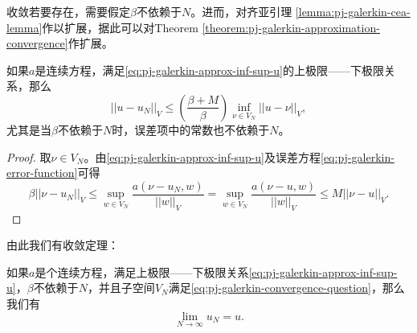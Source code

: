 \begin{subappendices}
收敛若要存在，需要假定$\beta$不依赖于$N$。进而，\cite{Babuska:1971fx}对齐亚引理 \ref{lemma:pj-galerkin-cea-lemma}作以扩展，据此可以对Theorem \ref{theorem:pj-galerkin-approximation-convergence}作扩展。
\begin{lemma}[扩展齐亚引理]
  \label{lemma:pj-galerkin-cea-lemma-genralization}
  如果$a$是连续方程，满足\eqref{eq:pj-galerkin-approx-inf-sup-u}的上极限——下极限关系，那么
  \begin{equation*}
    ||u - u_N||_{V} \le \left( \frac{\beta + M}{\beta}\right) \inf_{\nu \in V_N} || u - \nu ||_{V},
  \end{equation*}
  尤其是当$\beta$不依赖于$N$时，误差项中的常数也不依赖于$N$。
\end{lemma}
\begin{proof}
  取$\nu \in V_N$。由\eqref{eq:pj-galerkin-approx-inf-sup-u}及误差方程\eqref{eq:pj-galerkin-error-function}可得
  \begin{equation*}
    \beta || \nu - u_N || _{V}
    \le \sup_{w \in V_N} \frac{a(\nu - u_N, w)}{||w||_{V}}
    = \sup_{w \in V_N} \frac{a(\nu-u, w)}{||w||_{V}}
    \le M ||\nu - u||_{V}.
  \end{equation*}
\end{proof}
由此我们有收敛定理：
\begin{theorem}
  如果$a$是个连续方程，满足上极限——下极限关系\eqref{eq:pj-galerkin-approx-inf-sup-u}，$\beta$不依赖于$N$，并且子空间$V_N$满足\eqref{eq:pj-galerkin-convergence-question}，那么我们有
  \begin{equation*}
    \lim_{N \rightarrow \infty} u_N = u.
  \end{equation*}
\end{theorem}






















\end{subappendices}
